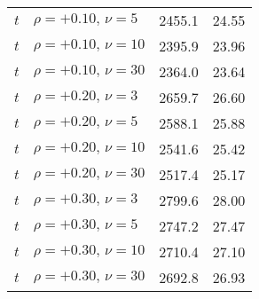 \begin{table}[t]
\begin{tabular}{l l r r}
    $t$ & $\rho=+0.10,\,\nu=5$ & 2455.1 & 24.55 \\
    $t$ & $\rho=+0.10,\,\nu=10$ & 2395.9 & 23.96 \\
    $t$ & $\rho=+0.10,\,\nu=30$ & 2364.0 & 23.64 \\
    $t$ & $\rho=+0.20,\,\nu=3$ & 2659.7 & 26.60 \\
    $t$ & $\rho=+0.20,\,\nu=5$ & 2588.1 & 25.88 \\
    $t$ & $\rho=+0.20,\,\nu=10$ & 2541.6 & 25.42 \\
    $t$ & $\rho=+0.20,\,\nu=30$ & 2517.4 & 25.17 \\
    $t$ & $\rho=+0.30,\,\nu=3$ & 2799.6 & 28.00 \\
    $t$ & $\rho=+0.30,\,\nu=5$ & 2747.2 & 27.47 \\
    $t$ & $\rho=+0.30,\,\nu=10$ & 2710.4 & 27.10 \\
    $t$ & $\rho=+0.30,\,\nu=30$ & 2692.8 & 26.93 \\
    \bottomrule
  \end{tabular}
\end{table}
